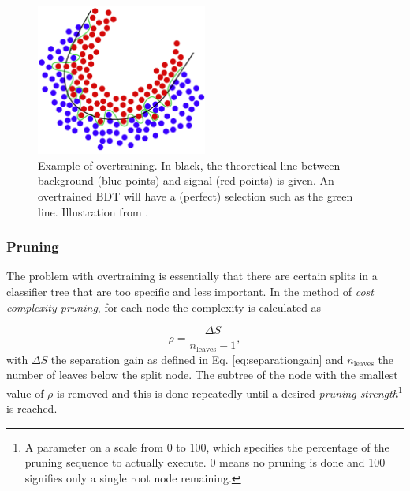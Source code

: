 \begin{figure}[t]
\centering
\includegraphics[width=0.5\textwidth]{chapter7/img/overtraining.png}
\caption{Example of overtraining. In black, the theoretical line between background (blue points) and signal (red points) is given. An overtrained BDT will have a (perfect) selection such as the green line. Illustration from \cite{boserpdf}.}
\label{fig:overtraining}
\end{figure}

\subsubsection{Pruning}
\label{subsub:pruning}
The problem with overtraining is essentially that there are certain splits in a classifier tree that are too specific and less important. In the method of \textit{cost complexity pruning}, for each node the complexity is calculated as

\begin{equation}
\rho = \frac{\Delta S}{n_{\textrm{leaves}} -1},
\end{equation}
\noindent with $\Delta S$ the separation gain as defined in Eq. \ref{eq:separationgain} and $n_\textrm{leaves}$ the number of leaves below the split node. The subtree of the node with the smallest value of $\rho$ is removed and this is done repeatedly until a desired \textit{pruning strength}\footnote{A parameter on a scale from 0 to 100, which specifies the percentage of the pruning sequence to actually execute. 0 means no pruning is done and 100 signifies only a single root node remaining.} is reached.\\
\newline
